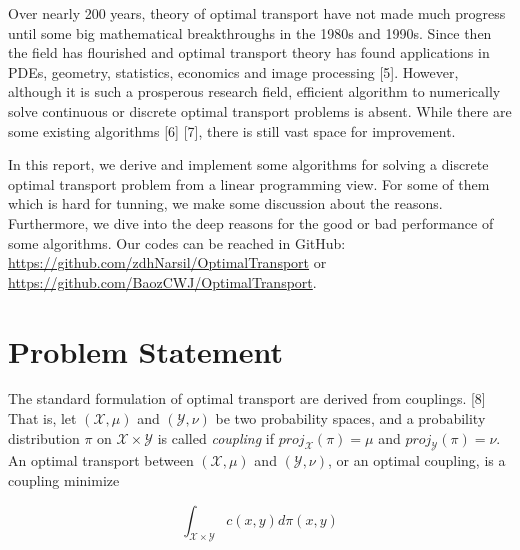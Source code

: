 \documentclass{article}
\begin{document}
\begin{large}
Over nearly 200 years, theory of optimal transport have not made much progress until some big mathematical breakthroughs in the 1980s and 1990s. Since then the field has flourished and optimal transport theory has found applications in PDEs, geometry, statistics, economics and image processing [5]. However, although it is such a prosperous research field, efficient algorithm to numerically solve continuous or discrete optimal transport problems is absent. While there are some existing algorithms [6] [7], there is still vast space for improvement.

In this report, we derive and implement some algorithms for solving a discrete optimal transport problem from a linear programming view. For some of them which is hard for tunning, we make some discussion about the reasons. Furthermore, we dive into the deep reasons for the good or bad performance of some algorithms. Our codes can be reached in GitHub: \href{https://github.com/zdhNarsil/OptimalTransport}{https://github.com/zdhNarsil/OptimalTransport} or \href{https://github.com/BaozCWJ/OptimalTransport}{https://github.com/BaozCWJ/OptimalTransport}. 

\section{Problem Statement}
The standard formulation of optimal transport are derived from couplings. [8] That is, let $ \left(\mathcal{X}, \mu \right)$ and $\left(\mathcal{Y}, \nu \right)$  be two probability spaces, and a probability distribution $\pi$ on $ \mathcal{X} \times \mathcal{Y} $ is called \emph{coupling} if $ proj_{\mathcal{X}} (\pi) = \mu $ and $ proj_{\mathcal{Y}} (\pi)= \nu $. An optimal transport between $ \left(\mathcal{X}, \mu \right)  $ and $ \left(\mathcal{Y}, \nu \right) $, or an optimal coupling, is a coupling minimize

\begin{equation}
\int_{ \mathcal{X} \times \mathcal{Y} } c ( x, y)  d \pi ( x, y ) 
\label{def}
\end{equation}


\end{large}
\end{document}
